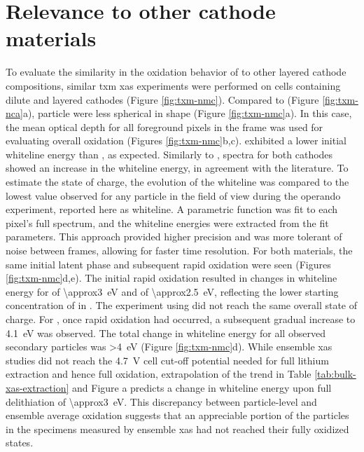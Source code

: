 \documentclass{article}
\begin{document}
\section{Relevance to other cathode materials}


To evaluate the similarity in the oxidation behavior of \nca{} to
other layered cathode compositions, similar \gls{txm} \gls{xas}
experiments were performed on cells containing dilute \nmc[333]{} and
\nmc[532]{} layered cathodes (Figure \ref{fig:txm-nmc}). Compared to
\nca{} (Figure \ref{fig:txm-nca}a), \nmc{} particle were less
spherical in shape (Figure \ref{fig:txm-nmc}a). In this case, the mean
optical depth for all foreground pixels in the frame was used for
evaluating overall oxidation (Figures
\ref{fig:txm-nmc}b,c). \nmc[333]{} exhibited a lower initial whiteline
energy than \nca{}, as expected\cite{deb2005,muto2009}. Similarly to
\nca{}, spectra for both \nmc{} cathodes showed an increase in the
whiteline energy, in agreement with the literature. To estimate the
state of charge, the evolution of the whiteline was compared to the
lowest value observed for any particle in the field of view during the
operando experiment, reported here as \textDelta{}whiteline. A
parametric function was fit to each pixel's full spectrum, and the
whiteline energies were extracted from the fit parameters. This
approach provided higher precision and was more tolerant of noise
between frames, allowing for faster time resolution. For both \nmc{}
materials, the same initial latent phase and subsequent rapid
oxidation were seen (Figures \ref{fig:txm-nmc}d,e). The initial rapid
 oxidation resulted in changes in whiteline energy for
\nmc[333]{} of \SI{\approx3}{\electronvolt} and \nmc[532]{} of
\SI{\approx2.5}{\electronvolt}, reflecting the lower starting
concentration of  in \nmc[532]{}. The experiment using
\nmc[532]{} did not reach the same overall state of charge. For
\nmc[333]{}, once rapid oxidation had occurred, a subsequent gradual
increase to \SI{4.1}{eV} was observed. The total change in whiteline
energy for all observed secondary particles was \SI{>4}{eV} (Figure
\ref{fig:txm-nmc}d). While ensemble \gls{xas}
studies\cite{deb2005,muto2009} did not reach the \SI{4.7}{V} cell
cut-off potential needed for full lithium extraction and hence full
 oxidation, extrapolation of the trend in Table
\ref{tab:bulk-xas-extraction} and Figure
a predicts a change in whiteline
energy upon full delithiation of \SI{\approx3}{eV}. This discrepancy
between particle-level and ensemble average  oxidation suggests
that an appreciable portion of the particles in the specimens measured
by ensemble \gls{xas} had not reached their fully oxidized states.
\end{document}
